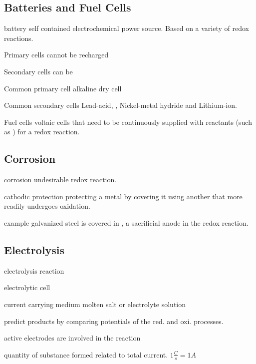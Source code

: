 \begin{mdframed}
\begin{multicols}{2}
\subsection{Batteries and Fuel Cells}
\begin{compactdesc}
    \item[battery] self contained electrochemical power source.
        Based on a variety of redox reactions.
    \item[Primary cells] cannot be recharged
    \item[Secondary cells] can be
    \item[Common primary cell]  alkaline dry cell
    \item[Common secondary cells] Lead-acid, , Nickel-metal hydride
        and Lithium-ion.
    \item[Fuel cells] voltaic cells that need to be continuously supplied with
        reactants (such as ) for a redox reaction.
\end{compactdesc}


\subsection{Corrosion}
\begin{compactdesc}
    \item[corrosion] undesirable redox reaction.
    \item[cathodic protection] protecting a metal by covering it using another
        that more readily undergoes oxidation.
    \item[example] galvanized steel is  covered in , a
        sacrificial anode in the redox reaction.
\end{compactdesc}

\end{multicols}
\end{mdframed}






\begin{mdframed}
\begin{multicols}{2}
\subsection{Electrolysis}
\begin{compactdesc}
    \item[electrolysis reaction]
    \item[electrolytic cell]
    \item[current carrying medium] molten salt or electrolyte solution
    \item[predict products] by comparing potentials of the red. and oxi. processes.
    \item[active electrodes] are involved in the reaction
    \item[quantity of substance formed] related to total current. $1\frac{C}{s} = 1A$
\end{compactdesc}
\end{multicols}
\end{mdframed}
